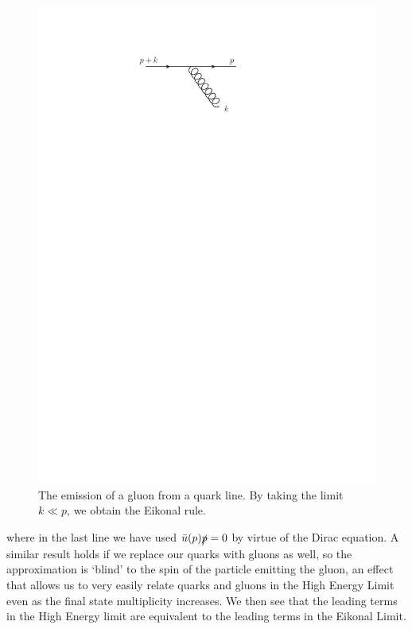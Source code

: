 \begin{figure}[t]
\centering
\includegraphics[scale=1.5]{Images/eikonal.pdf} 
\caption{The emission of a gluon from a quark line. By taking the limit $k \ll p$, we obtain the Eikonal rule.}
\label{fig:eikonal}
\end{figure}

where in the last line we have used $\bar{u}(p) \slashed{p} = 0$ by virtue of the Dirac equation. A similar result holds if we replace our quarks with gluons as well, so the approximation is `blind' to the spin of the particle emitting the gluon, an effect that allows us to very easily relate quarks and gluons in the High Energy Limit even as the final state multiplicity increases. We then see that the leading terms in the High Energy limit are equivalent to the leading terms in the Eikonal Limit. 

